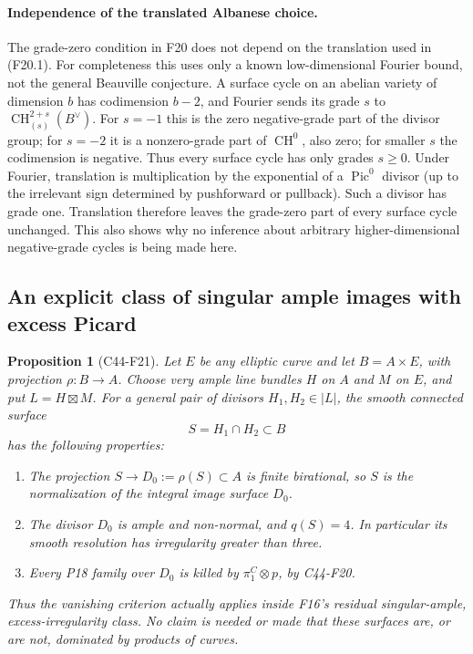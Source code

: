 \documentclass[11pt]{article}
\newtheorem{proposition}[theorem]{Proposition}
\theoremstyle{remark}\newtheorem{remark}[theorem]{Remark}
\begin{document}
\paragraph{Independence of the translated Albanese choice.}
The grade-zero condition in F20 does not depend on the
translation used in (F20.1).  For completeness this
uses only a known low-dimensional Fourier bound, not
the general Beauville conjecture.  A surface cycle on
an abelian variety of dimension $b$ has codimension
$b-2$, and Fourier sends its grade $s$ to
$\operatorname{CH}^{2+s}_{(s)}(B^\vee)$.
For $s=-1$ this is the zero negative-grade part of
the divisor group; for $s=-2$ it is a nonzero-grade
part of $\operatorname{CH}^0$, also zero; for smaller
$s$ the codimension is negative.  Thus every surface
cycle has only grades $s\ge0$.
Under Fourier, translation is multiplication by
the exponential of a $\operatorname{Pic}^0$ divisor
(up to the irrelevant sign determined by pushforward
or pullback).  Such a divisor has grade one.
Translation therefore leaves the grade-zero part
of every surface cycle unchanged.  This also shows
why no inference about arbitrary higher-dimensional
negative-grade cycles is being made here.

\subsection{An explicit class of singular ample images with excess Picard}

\begin{proposition}[C44-F21]\label{C44-F21}
Let $E$ be any elliptic curve and let
$B=A\times E$, with projection $\rho:B\to A$.
Choose very ample line bundles $H$ on $A$ and $M$ on
$E$, and put $L=H\boxtimes M$.
For a general pair of divisors $H_1,H_2\in|L|$,
the smooth connected surface
\[
                          S=H_1\cap H_2\subset B
 \tag{F21.1}
\]
has the following properties:
\begin{enumerate}
\item The projection $S\to D_0:=\rho(S)\subset A$
is finite birational, so $S$ is the normalization of
the integral image surface $D_0$.
\item The divisor $D_0$ is ample and non-normal,
and $q(S)=4$.  In particular its smooth resolution
has irregularity greater than three.
\item Every P18 family over $D_0$ is killed by
$\pi_1^C\otimes p$, by C44-F20.
\end{enumerate}
Thus the vanishing criterion actually applies inside
F16's residual singular-ample, excess-irregularity
class.  No claim is needed or made that these surfaces
are, or are not, dominated by products of curves.
\end{proposition}
\end{document}
